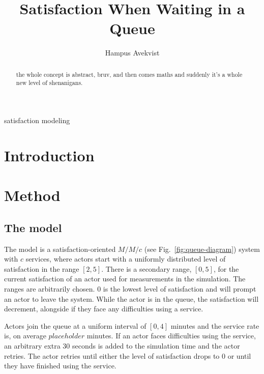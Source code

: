 \documentclass[conference]{IEEEtran}
\begin{document}
\title{Satisfaction When Waiting in a Queue}

\author{
    Hampus Avekvist \\
}

\maketitle

\begin{abstract}
    the whole concept is abstract, bruv, and then comes maths
    and suddenly it's a whole new level of shenanigans.
\end{abstract}

\begin{IEEEkeywords}
    satisfaction modeling
\end{IEEEkeywords}

\section{Introduction}

\section{Method}

\subsection{The model}

The model is a satisfaction-oriented $M/M/c$ \cite{Citation maybe?}
(see Fig.~\ref{fig:queue-diagram}) system with $c$ services, where
actors start with a uniformly distributed level of satisfaction
in the range $[2, 5]$. There is a secondary range, $[0, 5]$, for
the current satisfaction of an actor used for measurements in the
simulation. The ranges are arbitrarily chosen. $0$ is the lowest
level of satisfaction and will prompt an actor to leave the system.
While the actor is in the queue, the satisfaction will decrement,
alongside if they face any difficulties using a service. 

Actors join the queue at a uniform interval of $[0, 4]$ minutes
and the service rate is, on average $placeholder$ minutes. If an
actor faces difficulties using the service, an arbitrary extra 30
seconds is added to the simulation time and the actor retries. The
actor retries until either the level of satisfaction drops to $0$
or until they have finished using the service.
\end{document}
